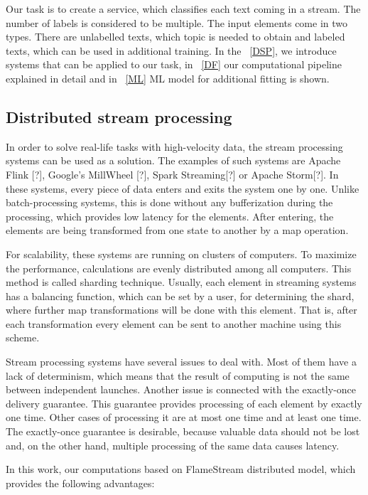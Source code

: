 
Our task is to create a service, which classifies each text coming in a stream. The number of labels is considered to be multiple. The input elements come in two types. There are unlabelled texts, which topic is needed to obtain and labeled texts, which can be used in additional training. In the ~\ref{DSP}, we introduce systems that can be applied to our task, in ~\ref{DF} our computational pipeline explained in detail and in ~\ref{ML} ML model for additional fitting is shown.

\subsection{Distributed stream processing\label{DSP}}

In order to solve real-life tasks with high-velocity data, the stream processing systems can be used as a solution. The examples of such systems are Apache Flink [?], Google's MillWheel [?], Spark Streaming[?] or Apache Storm[?]. In these systems, every piece of data enters and exits the system one by one. Unlike batch-processing systems, this is done without any bufferization during the processing, which provides low latency for the elements. After entering, the elements are being transformed from one state to another by a map operation. 

For scalability, these systems are running on clusters of computers. To maximize the performance, calculations are evenly distributed among all computers. This method is called sharding technique. Usually, each element in streaming systems has a balancing function, which can be set by a user, for determining the shard, where further map transformations will be done with this element. That is, after each transformation every element can be sent to another machine using this scheme.

Stream processing systems have several issues to deal with. Most of them have a lack of determinism, which means that the result of computing is not the same between independent launches. Another issue is connected with the exactly-once delivery guarantee. This guarantee provides processing of each element by exactly one time. Other cases of processing it are at most one time and at least one time. The exactly-once guarantee is desirable, because valuable data should not be lost and, on the other hand, multiple processing of the same data causes latency.

In this work, our computations based on FlameStream \cite{kuralenok2018flamestream} distributed model, which provides the following advantages:

